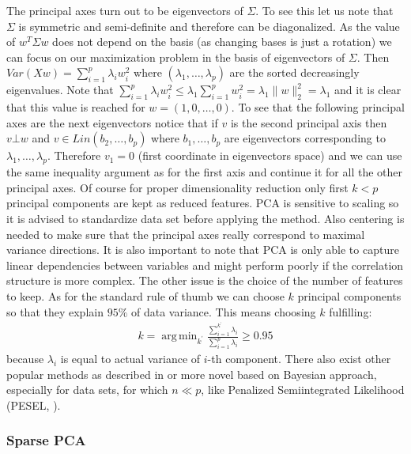 \documentclass[shortabstract, english, mgr]{iithesis}
\DeclareMathOperator*{\argmin}{arg\,min}
\begin{document}
The principal axes turn out to be eigenvectors of $\Sigma$. To see this let us note that $\Sigma$ is symmetric and semi-definite and therefore can be diagonalized. As the value of $w^T\Sigma w$ does not depend on the basis (as changing bases is just a rotation) we can focus on our maximization problem in the basis of eigenvectors of $\Sigma$. Then $Var(Xw) = \sum_{i=1}^p \lambda_i w_i^2$ where $(\lambda_1, \ldots, \lambda_p)$ are the sorted decreasingly eigenvalues. Note that $\sum_{i=1}^p \lambda_i w_i^2 \leq \lambda_1 \sum_{i=1}^p w_i^2 = \lambda_1 \| w\|_2^2 = \lambda_1$ and it is clear that this value is reached for $w = (1, 0, \ldots, 0)$. To see that the following principal axes are the next eigenvectors notice that if $v$ is the second principal axis then $v \bot w$ and $v \in Lin(b_2, \ldots, b_p)$ where $b_1, \ldots, b_p$ are eigenvectors corresponding to $\lambda_1, \ldots, \lambda_p$. Therefore $v_1 = 0$ (first coordinate in eigenvectors space) and we can use the same inequality argument as for the first axis and continue it for all the other principal axes. Of course for proper dimensionality reduction only first $k < p$ principal components are kept as reduced features. PCA is sensitive to scaling so it is advised to standardize data set before applying the method. Also centering is needed to make sure that the principal axes really correspond to maximal variance directions. It is also important to note that PCA is only able to capture linear dependencies between variables and might perform poorly if the correlation structure is more complex. The other issue is the choice of the number of features to keep. As for the standard rule of thumb we can choose $k$ principal components so that they explain $95\%$ of data variance. This means choosing $k$ fulfilling:
\begin{align*}
    k = \argmin_{k^{\prime}} \frac{\sum_{i=1}^{k^{\prime}} \lambda_i }{\sum_{i=1}^p \lambda_i} \geq 0.95
\end{align*}
because $\lambda_i$ is equal to actual variance of $i$-th component. There also exist other popular methods as described in \cite[chapter 6]{PCA} or more novel based on Bayesian approach, especially for data sets, for which $n \ll p$, like Penalized Semiintegrated Likelihood (PESEL, \cite{pesel}). 

\subsubsection{Sparse PCA}
\end{document}
